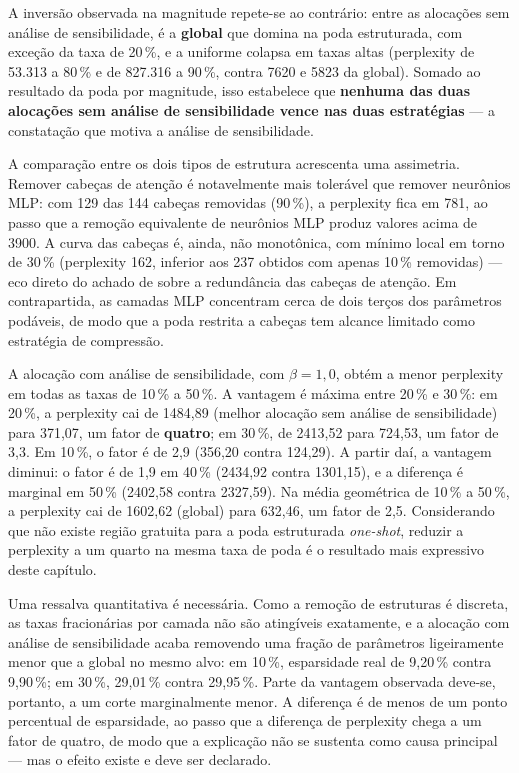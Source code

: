 A inversão observada na magnitude repete-se ao contrário: entre as alocações sem análise
de sensibilidade, é a \textbf{global} que domina na poda estruturada, com exceção da taxa
de 20\,\%, e a uniforme colapsa em taxas altas (perplexity de 53.313 a 80\,\% e de 827.316
a 90\,\%, contra 7620 e 5823 da global). Somado ao resultado da poda por magnitude, isso
estabelece que \textbf{nenhuma das duas alocações sem análise de sensibilidade vence nas
duas estratégias} --- a constatação que motiva a análise de sensibilidade.

A comparação entre os dois tipos de estrutura acrescenta uma assimetria. Remover cabeças
de atenção é notavelmente mais tolerável que remover neurônios MLP: com 129 das 144
cabeças removidas (90\,\%), a perplexity fica em 781, ao passo que a remoção equivalente
de neurônios MLP produz valores acima de 3900. A curva das cabeças é, ainda, não
monotônica, com mínimo local em torno de 30\,\% (perplexity 162, inferior aos 237 obtidos
com apenas 10\,\% removidas) --- eco direto do achado de  sobre a
redundância das cabeças de atenção. Em contrapartida, as camadas MLP concentram cerca de
dois terços dos parâmetros podáveis, de modo que a poda restrita a cabeças tem alcance
limitado como estratégia de compressão.

A alocação com análise de sensibilidade, com $\beta = 1{,}0$, obtém a menor perplexity em
todas as taxas de 10\,\% a 50\,\%. A vantagem é máxima entre 20\,\% e 30\,\%: em 20\,\%, a
perplexity cai de 1484,89 (melhor alocação sem análise de sensibilidade) para 371,07, um
fator de \textbf{quatro}; em 30\,\%, de 2413,52 para 724,53, um fator de 3,3. Em 10\,\%,
o fator é de 2,9 (356,20 contra 124,29). A partir daí, a vantagem diminui: o fator é de
1,9 em 40\,\% (2434,92 contra 1301,15), e a diferença é marginal em 50\,\% (2402,58 contra
2327,59). Na média geométrica de 10\,\% a 50\,\%, a perplexity cai de 1602,62 (global)
para 632,46, um fator de 2,5. Considerando que não existe região gratuita para a poda
estruturada \textit{one-shot}, reduzir a perplexity a um quarto na mesma taxa de poda é o
resultado mais expressivo deste capítulo.

Uma ressalva quantitativa é necessária. Como a remoção de estruturas é
discreta, as taxas fracionárias por camada não são atingíveis exatamente, e a
alocação com análise de sensibilidade acaba removendo uma fração de parâmetros
ligeiramente menor que a global no mesmo alvo: em 10\,\%, esparsidade real de 9,20\,\%
contra 9,90\,\%; em 30\,\%, 29,01\,\% contra 29,95\,\%. Parte da
vantagem observada deve-se, portanto, a um corte marginalmente menor. A
diferença é de menos de um ponto percentual de esparsidade, ao passo que a
diferença de perplexity chega a um fator de quatro, de modo que a explicação
não se sustenta como causa principal --- mas o efeito existe e deve ser
declarado.

